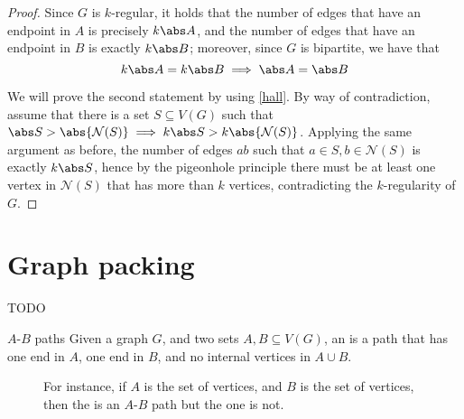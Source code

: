 \documentclass[a4paper, 12pt]{report}
\begin{document}
    \begin{proof}
        Since $G$ is $k$-regular, it holds that the number of edges that have an endpoint in $A$ is precisely $k \abs A$, and the number of edges that have an endpoint in $B$ is exactly $k \abs B$; moreover, since $G$ is bipartite, we have that $$k \abs A = k \abs B \implies \abs A = \abs B$$

        We will prove the second statement by using \cref{hall}. By way of contradiction, assume that there is a set $S \subseteq V(G)$ such that $\abs S > \abs{\mathcal N(S)} \implies k \abs S > k \abs{\mathcal N (S)}$. Applying the same argument as before, the number of edges $ab$ such that $a \in S, b \in \mathcal N (S)$ is exactly $k \abs S$, hence by the pigeonhole principle there must be at least one vertex in $\mathcal N (S)$ that has more than $k$ vertices, contradicting the $k$-regularity of $G$.
    \end{proof}

    \chapter{Graph packing}

    TODO 
    
    \begin{frameddefn}{$A$-$B$ paths}
        Given a graph $G$, and two sets $A, B \subseteq V(G)$, an  is a path that has one end in $A$, one end in $B$, and no internal vertices in $A \cup B$.
    \end{frameddefn}

    \begin{figure}[H]
        \centering
        \caption{For instance, if $A$ is the set of  vertices, and $B$ is the set of  vertices, then the  is an $A$-$B$ path but the  one is not.}
    \end{figure}
\end{document}
